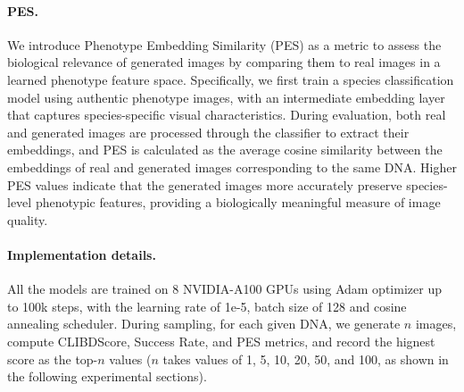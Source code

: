 \paragraph{PES.} We introduce Phenotype Embedding Similarity (PES) as a metric to assess the biological relevance of generated images by comparing them to real images in a learned phenotype feature space. Specifically, we first train a species classification model using authentic phenotype images, with an intermediate embedding layer that captures species-specific visual characteristics. During evaluation, both real and generated images are processed through the classifier to extract their embeddings, and PES is calculated as the average cosine similarity between the embeddings of real and generated images corresponding to the same DNA. Higher PES values indicate that the generated images more accurately preserve species-level phenotypic features, providing a biologically meaningful measure of image quality.




\vspace{-5mm}
\paragraph{Implementation details.} All the models are trained on 8 NVIDIA-A100 GPUs using Adam optimizer \cite{kingma2014adam} up to 100k steps, with the learning rate of 1e-5, batch size of 128 and cosine annealing scheduler. 
During sampling, for each given DNA, we generate $n$ images, compute CLIBDScore, Success Rate, and PES metrics, and record the hignest score as the top-$n$ values ($n$ takes values of 1, 5, 10, 20, 50, and 100, as shown in the following experimental sections).






